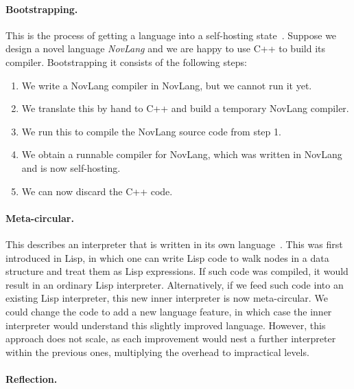 \paragraph{Bootstrapping.}

This is the process of getting a language into a self-hosting
state~\cite{Bootfrom0}. Suppose we design a novel language
\emph{NovLang} and we are happy to use C++ to build its compiler.
Bootstrapping it consists of the following steps:

\begin{enumerate}
\def\labelenumi{\arabic{enumi}.}
\tightlist
\item
  We write a NovLang compiler in NovLang, but we cannot run it yet.
\item
  We translate this by hand to C++ and build a temporary NovLang
  compiler.
\item
  We run this to compile the NovLang source code from step 1.
\item
  We obtain a runnable compiler for NovLang, which was written in
  NovLang and is now self-hosting.
\item
  We can now discard the C++ code.
\end{enumerate}

\paragraph{Meta-circular.}

This describes an interpreter that is written in its own
language~\cite{Metac}. This was first introduced in Lisp, in which one
can write Lisp code to walk nodes in a data structure and treat them as
Lisp expressions. If such code was compiled, it would result in an
ordinary Lisp interpreter. Alternatively, if we feed such code into an
existing Lisp interpreter, this new inner interpreter is now
meta-circular. We could change the code to add a new language feature,
in which case the inner interpreter would understand this slightly
improved language. However, this approach does not scale, as each
improvement would nest a further interpreter within the previous ones,
multiplying the overhead to impractical levels.

\paragraph{Reflection.}


